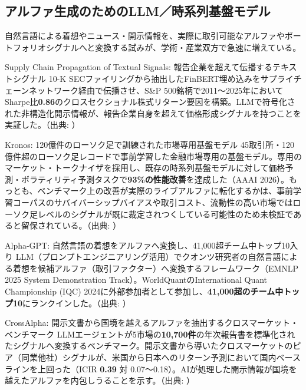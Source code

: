 \subsection{アルファ生成のためのLLM／時系列基盤モデル}

自然言語による着想やニュース・開示情報を、実際に取引可能なアルファやポートフォリオシグナルへと変換する試みが、学術・産業双方で急速に増えている。

\begin{casestudy}{Supply Chain Propagation of Textual Signals: 報告企業を超えて伝播するテキストシグナル}
10-K SECファイリングから抽出したFinBERT埋め込みをサプライチェーンネットワーク経由で伝播させ、S\&P 500銘柄で2011〜2025年においてSharpe比\textbf{0.86}のクロスセクショナル株式リターン要因を構築。LLMで符号化された非構造化開示情報が、報告企業自身を超えて価格形成シグナルを持つことを実証した。（出典: \cite{supplychain2026}）
\end{casestudy}

\begin{casestudy}{Kronos: 120億件のローソク足で訓練された市場専用基盤モデル}
45取引所・120億件超のローソク足レコードで事前学習した金融市場専用の基盤モデル。専用のマーケット・トークナイザを採用し、既存の時系列基盤モデルに対して価格予測・ボラティリティ予測タスクで\textbf{93\%の性能改善}を達成した（AAAI 2026）。もっとも、ベンチマーク上の改善が実際のライブアルファに転化するかは、事前学習コーパスのサバイバーシップバイアスや取引コスト、流動性の高い市場ではローソク足レベルのシグナルが既に裁定されつくしている可能性のため未検証であると留保されている。（出典: \cite{kronos2025}）
\end{casestudy}

\begin{casestudy}{Alpha-GPT: 自然言語の着想をアルファへ変換し、41,000超チーム中トップ10入り}
LLM（プロンプトエンジニアリング活用）でクオンツ研究者の自然言語による着想を候補アルファ（取引ファクター）へ変換するフレームワーク（EMNLP 2025 System Demonstration Track）。WorldQuantのInternational Quant Championship (IQC) 2024に外部参加者として参加し、\textbf{41,000超のチーム中トップ10}にランクインした。（出典: \cite{alphagpt2023}）
\end{casestudy}

\begin{casestudy}{CrossAlpha: 開示文書から国境を越えるアルファを抽出するクロスマーケット・ベンチマーク}
LLMエージェントが5市場の\textbf{10,700件}の年次報告書を標準化されたシグナルへ変換するベンチマーク。開示文書から導いたクロスマーケットのピア（同業他社）シグナルが、米国から日本へのリターン予測において国内ベースラインを上回った（ICIR \textbf{0.39} 対 0.07〜0.18）。AIが処理した開示情報が国境を越えたアルファを内包しうることを示す。（出典: \cite{crossalpha2026}）
\end{casestudy}


